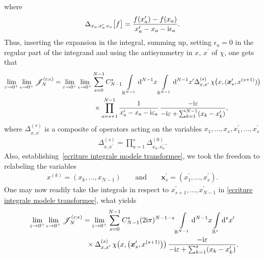 where
\begin{gather*}
\Delta_{x_a,x_a^{\prime}; \epsilon_a}\big[ f\big] = \frac{ f(x_a^{\prime})-f(x_a ) }{x^{\prime}_a-x_a-{\rm i} \epsilon_a } .
\end{gather*}
Thus, inserting the expansion in the integral, summing up, setting $\epsilon_a=0$ in the regular part of the integrand and using the
antisymmetry in $x$, $x^{\prime}$ of $\chi$, one gets that
\begin{gather}
 \lim_{\varepsilon\rightarrow 0^+} \lim_{ \epsilon \rightarrow 0^+ } \mathscr{J}_N^{(\varepsilon;\epsilon)} =
 \lim_{\varepsilon\rightarrow 0^+} \lim_{\epsilon \rightarrow 0^+ }
\sum_{s=0}^{N-1} C^{s}_{N-1}
 \int\limits_{\mathbb{R}^{N-1}}{} {\rm d}^{N-1}x \int\limits_{\mathbb{R}^{N-1}}{} {\rm d}^{N-1}x^{\prime} \Delta^{(s)}_{x,x^{\prime} } \,
\chi\big( x,(\boldsymbol{x}_s^{\prime},x^{(s+1)})\big) \nonumber
\\ \hphantom{ \lim_{\varepsilon\rightarrow 0^+} \lim_{ \epsilon \rightarrow 0^+ } \mathscr{J}_N^{(\varepsilon;\epsilon)} =}
\times \prod\limits_{a=s+1}^{N-1} \frac{1}{x^{\prime}_a-x_a-{\rm i} \varepsilon_a }
\, \frac{-{\rm i} \varepsilon }{-{\rm i} \varepsilon + \sum_{k=1}^{N-1}(x_k - x_k^{\prime}) },
\label{ecriture integrale modele transformee}
\end{gather}
where $\Delta^{(s)}_{x,x^{\prime} }$ is a composite of operators acting on the variables $x_1,\dots, x_s, x_1^{\prime},\dots,
x_{s}^{\prime}$
\begin{gather*}
\Delta^{(s)}_{x,x^{\prime} } = \prod\limits_{a=1}^{s} \Delta_{x_a,x_a^{\prime}}^{(0)} .
\end{gather*}
Also, establishing~\eqref{ecriture integrale modele transformee}, we took the freedom to relabeling the variables %
\begin{gather*}
x^{(k)} = (x_k,\dots, x_{N-1 } ) \qquad \text{and} \qquad \boldsymbol{x}_s^{\prime} =(x_1^{\prime},\dots, x_{s}^{\prime}).
\end{gather*}
One may now readily take the integrals in respect to $x^{\prime}_{s+1},\dots, x^{\prime}_{N-1}$ in \eqref{ecriture integrale modele
transformee}, what yields
\begin{gather*}
\lim_{\varepsilon\rightarrow 0^+} \lim_{\epsilon \rightarrow 0^+ }
 \mathscr{J}_N^{(\varepsilon;\epsilon)} = \lim_{\varepsilon\rightarrow 0^+}
\sum_{s=0}^{N-1} C^{s}_{N-1} (2 {\rm i}\pi)^{N-1-s}
\int\limits_{\mathbb{R}^{N-1}}{} {\rm d}^{N-1}x \int\limits_{\mathbb{R}^{s}}{} {\rm d}^{s}x^{\prime}
\\ \hphantom{\lim_{\varepsilon\rightarrow 0^+} \lim_{\epsilon \rightarrow 0^+ }
 \mathscr{J}_N^{(\varepsilon;\epsilon)} =}
\times \Delta^{(s)}_{x,x^{\prime} } \, \chi\big( x,\big(\boldsymbol{x}_s^{\prime},x^{(s+1)}\big)\big)
\, \frac{-{\rm i} \varepsilon }{-{\rm i} \varepsilon + \sum_{k=1}^{s}(x_k - x_k^{\prime}) }.
\end{gather*}
